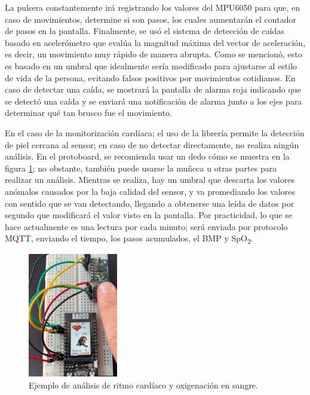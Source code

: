 \documentclass[12pt, a4paper]{article}
\begin{document}
	
	La pulsera constantemente irá registrando los valores del MPU6050 para que, en caso de movimientos, determine si son pasos, los cuales aumentarán el contador de pasos en la pantalla. Finalmente, se usó el sistema de detección de caídas basado en acelerómetro que evalúa la magnitud máxima del vector de aceleración, es decir, un movimiento muy rápido de manera abrupta. Como se mencionó, esto es basado en un umbral que idealmente sería modificado para ajustarse al estilo de vida de la persona, evitando falsos positivos por movimientos cotidianos. En caso de detectar una caída, se mostrará la pantalla de alarma roja indicando que se detectó una caída y se enviará una notificación de alarma junto a los ejes para determinar qué tan brusco fue el movimiento.
	
	En el caso de la monitorización cardíaca; el uso de la librería permite la detección de piel cercana al sensor; en caso de no detectar directamente, no realiza ningún análisis. En el protoboard, se recomienda usar un dedo cómo se muestra en la figura \ref{fig:sangre}; no obstante, también puede usarse la muñeca u otras partes para realizar un análisis. Mientras se realiza, hay un umbral que descarta los valores anómalos causados por la baja calidad del sensor, y va promediando los valores con sentido que se van detectando, llegando a obtenerse una leída de datos por segundo que modificará el valor visto en la pantalla. Por practicidad, lo que se hace actualmente es una lectura por cada minuto; será enviada por protocolo MQTT, enviando el tiempo, los pasos acumulados, el BMP y SpO\textsubscript{2}.
	
	\begin{figure}[htbp]
		\centering
		\includegraphics[width=0.35\textwidth]{images/analizando.jpg}
		\caption[Ejemplo]{Ejemplo de análisis de ritmo cardíaco y oxigenación en sangre.}
		\label{fig:sangre}
	\end{figure}
	
\end{document}
